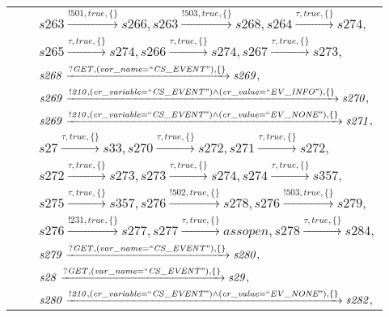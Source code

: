 \begin{tabular}{lcl}
& & $\mathit{s263}\xrightarrow{\mathit{!501}, \mathit{true}, \{\}}\mathit{s266},\mathit{s263}\xrightarrow{\mathit{!503}, \mathit{true}, \{\}}\mathit{s268},\mathit{s264}\xrightarrow{\mathit{\tau}, \mathit{true}, \{\}}\mathit{s274},$ \\
& & $\mathit{s265}\xrightarrow{\mathit{\tau}, \mathit{true}, \{\}}\mathit{s274},\mathit{s266}\xrightarrow{\mathit{\tau}, \mathit{true}, \{\}}\mathit{s274},\mathit{s267}\xrightarrow{\mathit{\tau}, \mathit{true}, \{\}}\mathit{s273},$ \\
& & $\mathit{s268}\xrightarrow{\mathit{?GET}, \mathit{(var\_name = ``CS\_EVENT")}, \{\}}\mathit{s269},$ \\
& & $\mathit{s269}\xrightarrow{\mathit{!210}, \mathit{(cr\_variable = ``CS\_EVENT") \land (cr\_value = ``EV\_INFO")}, \{\}}\mathit{s270},$ \\
& & $\mathit{s269}\xrightarrow{\mathit{!210}, \mathit{(cr\_variable = ``CS\_EVENT") \land (cr\_value = ``EV\_NONE")}, \{\}}\mathit{s271},$ \\
& & $\mathit{s27}\xrightarrow{\mathit{\tau}, \mathit{true}, \{\}}\mathit{s33},\mathit{s270}\xrightarrow{\mathit{\tau}, \mathit{true}, \{\}}\mathit{s272},\mathit{s271}\xrightarrow{\mathit{\tau}, \mathit{true}, \{\}}\mathit{s272},$ \\
& & $\mathit{s272}\xrightarrow{\mathit{\tau}, \mathit{true}, \{\}}\mathit{s273},\mathit{s273}\xrightarrow{\mathit{\tau}, \mathit{true}, \{\}}\mathit{s274},\mathit{s274}\xrightarrow{\mathit{\tau}, \mathit{true}, \{\}}\mathit{s357},$ \\
& & $\mathit{s275}\xrightarrow{\mathit{\tau}, \mathit{true}, \{\}}\mathit{s357},\mathit{s276}\xrightarrow{\mathit{!502}, \mathit{true}, \{\}}\mathit{s278},\mathit{s276}\xrightarrow{\mathit{!503}, \mathit{true}, \{\}}\mathit{s279},$ \\
& & $\mathit{s276}\xrightarrow{\mathit{!231}, \mathit{true}, \{\}}\mathit{s277},\mathit{s277}\xrightarrow{\mathit{\tau}, \mathit{true}, \{\}}\mathit{assopen},\mathit{s278}\xrightarrow{\mathit{\tau}, \mathit{true}, \{\}}\mathit{s284},$ \\
& & $\mathit{s279}\xrightarrow{\mathit{?GET}, \mathit{(var\_name = ``CS\_EVENT")}, \{\}}\mathit{s280},$ \\
& & $\mathit{s28}\xrightarrow{\mathit{?GET}, \mathit{(var\_name = ``CS\_EVENT")}, \{\}}\mathit{s29},$ \\
& & $\mathit{s280}\xrightarrow{\mathit{!210}, \mathit{(cr\_variable = ``CS\_EVENT") \land (cr\_value = ``EV\_NONE")}, \{\}}\mathit{s282},$ \\

\end{tabular}
